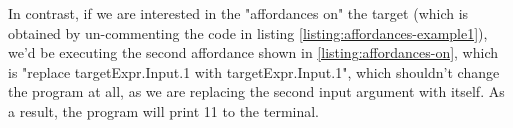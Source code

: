 \documentclass[11pt,fleqn,openany]{book} %
\begin{document}
In contrast, if we are interested in the "affordances on" the target (which is obtained by un-commenting the code in listing \ref{listing:affordances-example1}), we'd be executing the second affordance shown in \ref{listing:affordances-on}, which is "replace targetExpr.Input.1 with targetExpr.Input.1", which shouldn't change the program at all, as we are replacing the second input argument with itself. As a result, the program will print 11 to the terminal.


\end{document}

